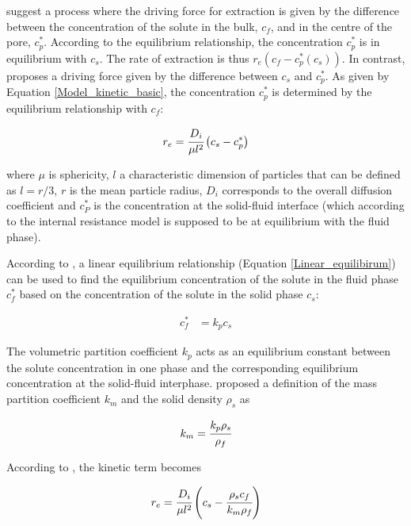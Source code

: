 \documentclass[a4paper,fleqn]{cas-dc}
\begin{document}
		\citet{Bulley1984} suggest a process where the driving force for extraction is given by the difference between the concentration of the solute in the bulk, $c_f$, and in the centre of the pore, $c_p^*$. According to the equilibrium relationship, the concentration $c_p^*$ is in equilibrium with $c_s$. The rate of extraction is thus $r_e\left(c_f - c^*_p(c_s)\right)$. In contrast, \citet{Reverchon1996} proposes a driving force given by the difference between $c_s$ and $c_p^*$. As given by Equation \ref{Model_kinetic_basic}, the concentration $c_p^*$ is determined by the equilibrium relationship with $c_f$:
		
		{\footnotesize
			\begin{equation} \label{Model_kinetic_basic}
				r_e = \cfrac{D_i}{\mu l^2 }\left(c_s - c_p^* \right)
		\end{equation} }
		
		where $\mu$ is sphericity, $l$ a characteristic dimension of particles that can be defined as $l = r/3$, $r$ is the mean particle radius, $D_i$ corresponds to the overall diffusion coefficient and $c_P^*$ is the concentration at the solid-fluid interface (which according to the internal resistance model is supposed to be at equilibrium with the fluid phase). 
		
		According to \citet{Bulley1984}, a linear equilibrium relationship (Equation \ref{Linear_equilibirum}) can be used to find the equilibrium concentration of the solute in the fluid phase $c_f^*$ based on the concentration of the solute in the solid phase $c_s$:
		
		{\footnotesize
			\begin{align} \label{Linear_equilibirum}
				c_f^* &= k_p c_s
		\end{align} }
		
		The volumetric partition coefficient $k_p$ acts as an equilibrium constant between the solute concentration in one phase and the corresponding equilibrium concentration at the solid-fluid interphase. \citet{Spiro2007} proposed a definition of the mass partition coefficient $k_m$ and the solid density $\rho_s$ as 
		
		{\footnotesize
			\begin{align}
				k_m = \cfrac{k_p \rho_s}{\rho_f}
		\end{align} }
		
		According to \citet{Reverchon1996}, the kinetic term becomes
		
		{\footnotesize
			\begin{equation}
				\label{Model_kinetic_no_sat}
				r_e = \cfrac{D_i}{ \mu l^2 } \left(c_s - \cfrac{\rho_s c_f}{k_m \rho_f} \right)
		\end{equation} }
		
\end{document}
